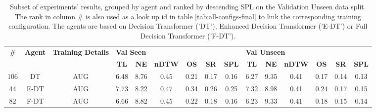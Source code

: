 \begin{table}
\centering
\caption{\label{tab:env_drop}Subset of experiments' results, grouped by agent and ranked by descending SPL on the Validation Unseen data split. The rank in column \# is also used as a look up id in table \ref{tab:all-configs-final} to link the corresponding training configuration.     \newline The agents are based on Decision Transformer ('DT'), Enhanced Decision Transformer ('E-DT') or Full Decision Transformer ('F-DT').}
\begin{tabular}{@{\hskip3pt}c@{\hskip3pt}c@{\hskip3pt}c@{\hskip3pt}c@{\hskip3pt}c@{\hskip3pt}c@{\hskip3pt}c@{\hskip3pt}c@{\hskip3pt}c@{\hskip3pt}c@{\hskip3pt}c@{\hskip3pt}c@{\hskip3pt}c@{\hskip3pt}c@{\hskip3pt}c}
\toprule
\textbf{\#} & \textbf{Agent} & \textbf{Training Details} & \multicolumn{6}{l}{\textbf{Val Seen}} & \multicolumn{6}{l}{\textbf{Val Unseen}} \\
 \textbf{~} &     \textbf{~} &                \textbf{~} &       \textbf{TL} & \textbf{NE} & \textbf{nDTW} & \textbf{OS} & \textbf{SR} & \textbf{SPL} &         \textbf{TL} & \textbf{NE} & \textbf{nDTW} & \textbf{OS} & \textbf{SR} & \textbf{SPL} \\
\midrule
        106 &             DT &                       AUG &              6.48 &        8.76 &          0.45 &        0.21 &        0.17 &         0.16 &                6.27 &        9.35 &          0.41 &        0.17 &        0.14 &         0.13 \\
         44 &           E-DT &                       AUG &              7.73 &        8.22 &          0.47 &        0.34 &        0.26 &         0.25 &                7.32 &        8.98 &          0.41 &        0.24 &        0.17 &         0.15 \\
         82 &           F-DT &                       AUG &              6.66 &        8.82 &          0.45 &        0.22 &        0.18 &         0.16 &                6.23 &        9.33 &          0.41 &        0.18 &        0.15 &         0.14 \\
\bottomrule
\end{tabular}
\end{table}
